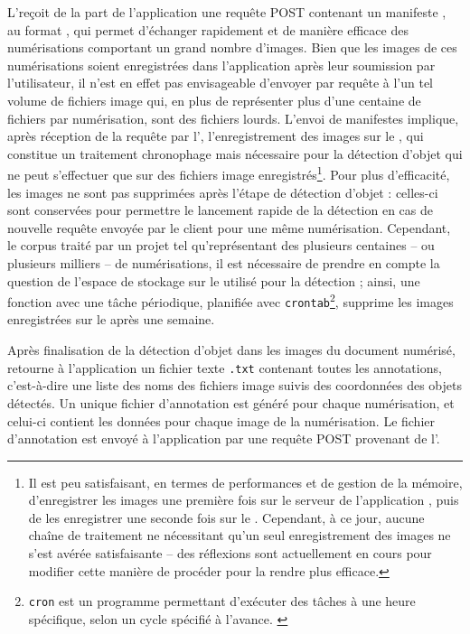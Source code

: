 	L'\api reçoit de la part de l'application une requête POST contenant un manifeste \iiif, au format \json, qui permet d'échanger rapidement et de manière efficace des numérisations comportant un grand nombre d'images. Bien que les images de ces numérisations soient enregistrées dans l'application \eida après leur soumission par l'utilisateur, il n'est en effet pas envisageable d'envoyer par requête \http à l'\api un tel volume de fichiers image qui, en plus de représenter plus d'une centaine de fichiers par numérisation, sont des fichiers lourds. L'envoi de manifestes \iiif implique, après réception de la requête par l'\api, l'enregistrement des images sur le \gpu, qui constitue un traitement chronophage mais nécessaire pour la détection d'objet qui ne peut s'effectuer que sur des fichiers image enregistrés\footnote{Il est peu satisfaisant, en termes de performances et de gestion de la mémoire, d'enregistrer les images une première fois sur le serveur de l'application \eida, puis de les enregistrer une seconde fois sur le \gpu. Cependant, à ce jour, aucune chaîne de traitement ne nécessitant qu'un seul enregistrement des images ne s'est avérée satisfaisante -- des réflexions sont actuellement en cours pour modifier cette manière de procéder pour la rendre plus efficace.}. Pour plus d'efficacité, les images ne sont pas supprimées après l'étape de détection d'objet : celles-ci sont conservées pour permettre le lancement rapide de la détection en cas de nouvelle requête envoyée par le client pour une même numérisation. Cependant, le corpus traité par un projet tel qu'\eida représentant des plusieurs centaines -- ou plusieurs milliers -- de numérisations, il est nécessaire de prendre en compte la question de l'espace de stockage sur le \gpu utilisé pour la détection ; ainsi, une fonction avec une tâche périodique, planifiée avec \texttt{crontab}\footnote{\texttt{cron} est un programme permettant d'exécuter des tâches à une heure spécifique, selon un cycle spécifié à l'avance. \cite{Cron2023}}, supprime les images enregistrées sur le \gpu après une semaine.
	
	Après finalisation de la détection d'objet dans les images du document numérisé, \exapi retourne à l'application un fichier texte \texttt{.txt} contenant toutes les annotations, c'est-à-dire une liste des noms des fichiers image suivis des coordonnées des objets détectés. Un unique fichier d'annotation est généré pour chaque numérisation, et celui-ci contient les données pour chaque image de la numérisation. Le fichier d'annotation est envoyé à l'application \eida par une requête POST provenant de l'\api.
	
